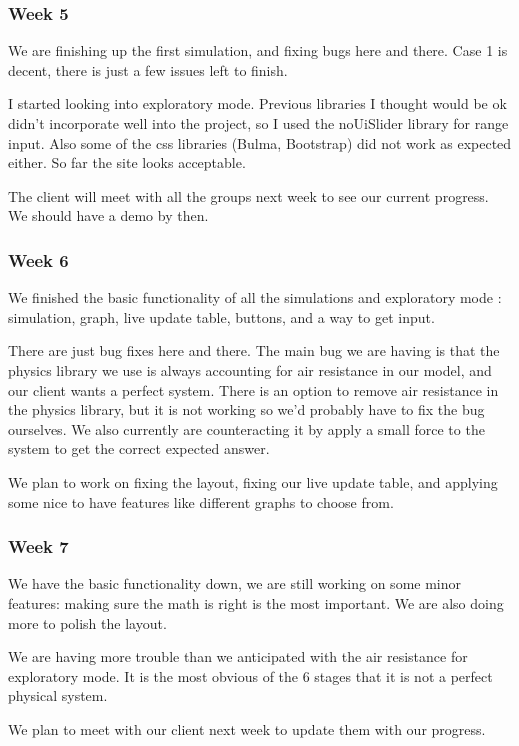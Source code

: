 \subsubsection{Week 5}
We are finishing up the first simulation, and fixing bugs here and there. Case 1 is decent, there is just a few issues left to finish. 

I started looking into exploratory mode. Previous libraries I thought would be ok didn't incorporate well into the project, so I used the noUiSlider library for range input. Also some of the css libraries (Bulma, Bootstrap) did not work as expected either. So far the site looks acceptable. 

The client will meet with all the groups next week to see our current progress. We should have a demo by then.

\subsubsection{Week 6}
We finished the basic functionality of all the simulations and exploratory mode : simulation, graph, live update table, buttons, and a way to get input. 

There are just bug fixes here and there. The main bug we are having is that the physics library we use is always accounting for air resistance in our model, and our client wants a perfect system. There is an option to remove air resistance in the physics library, but it is not working so we'd probably have to fix the bug ourselves. We also currently are counteracting it by apply a small force to the system to get the correct expected answer.

We plan to work on fixing the layout, fixing our live update table, and applying some nice to have features like different graphs to choose from. 

\subsubsection{Week 7}
We have the basic functionality down, we are still working on some minor features: making sure the math is right is the most important. We are also doing more to polish the layout. 

We are having more trouble than we anticipated with the air resistance for exploratory mode. It is the most obvious of the 6 stages that it is not a perfect physical system. 

We plan to meet with our client next week to update them with our progress. 

